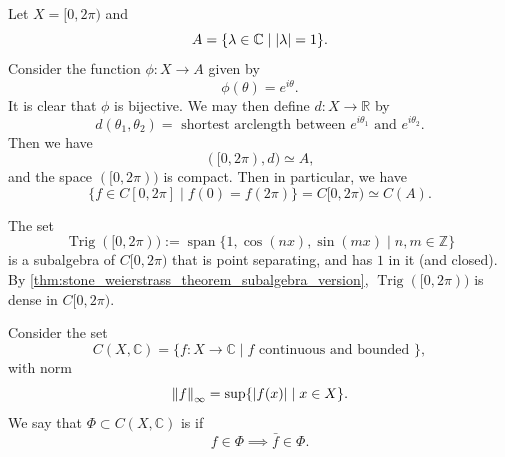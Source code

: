 \documentclass[notoc,notitlepage]{tufte-book}
\DeclareMathOperator{\Span}{span }
\DeclareMathOperator{\Trig}{Trig }
\newcommand{\norm}[1]{\left\| #1 \right\|}
\begin{document}
\begin{eg}
  Let $X = [0, 2 \pi)$ and
  \begin{equation*}
    A = \{ \lambda \in \mathbb{C} \mid \left| \lambda \right| = 1 \}.
  \end{equation*}
  Consider the function $\phi : X \to A$ given by
  \begin{equation*}
    \phi(\theta) = e^{i \theta}.
  \end{equation*}
  It is clear that $\phi$ is bijective. We may then define $d : X \to \mathbb{R}$ by
  \begin{equation*}
    d(\theta_1, \theta_2) = \text{ shortest arclength between } e^{i \theta_1} \text{ and } e^{i \theta_2}.
  \end{equation*}
  Then we have
  \begin{equation*}
    ([0, 2 \pi), d) \simeq A,
  \end{equation*}
  and the space $([0, 2 \pi))$ is compact. Then in particular, we have
  \begin{equation*}
    \{ f \in C[0, 2 \pi] \mid f(0) = f(2 \pi) \} = C[0, 2 \pi) \simeq C(A).
  \end{equation*}
\end{eg}

\begin{eg}
  The set
  \begin{equation*}
    \Trig([0, 2 \pi)) := \Span \{ 1, \cos ( n x ), \sin ( m x ) \mid n, m \in \mathbb{Z} \}
  \end{equation*}
  is a subalgebra of $C[0, 2 \pi)$ that is point separating, and has $1$ in it (and closed). By \cref{thm:stone_weierstrass_theorem_subalgebra_version}, $\Trig([0, 2 \pi))$ is dense in $C[0, 2 \pi)$.
\end{eg}

\begin{note}
  Consider the set
  \begin{equation*}
    C(X, \mathbb{C}) = \{ f : X \to \mathbb{C} \mid f \text{ continuous and bounded } \},
  \end{equation*}
  with norm
  \begin{equation*}
    \norm{ f }_\infty = \sup \{ \abs{ f(x) } \mid x \in X \}.
  \end{equation*}
  We say that $\Phi \subset C(X, \mathbb{C})$ is  if
  \begin{equation*}
    f \in \Phi \implies \bar{f} \in \Phi.
  \end{equation*}
\end{note}
\end{document}
